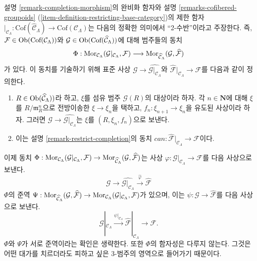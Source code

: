 \begin{remark}
\label{remark-completion-restriction-adjoint}
설명 \ref{remark-completion-morphism}의 완비화 함자와 설명
\ref{remarks-cofibered-groupoids}
(\ref{item-definition-restricting-base-category})의 제한 함자
$|_{\mathcal{C}_\Lambda} : \text{Cof}(\widehat{\mathcal{C}}_\Lambda)
\to \text{Cof}(\mathcal{C}_\Lambda)$는 다음의 정확한 의미에서
``2-수반''이라고 주장한다. 즉,
$\mathcal{F} \in \mathop{\mathrm{Ob}}\nolimits(\text{Cof}(\mathcal{C}_\Lambda))$와
$\mathcal{G} \in \mathop{\mathrm{Ob}}\nolimits(\text{Cof}(\widehat{\mathcal{C}}_\Lambda))$에 대해
범주들의 동치
$$
\Phi :
\mathop{\mathrm{Mor}}\nolimits_{\mathcal{C}_\Lambda}(
\mathcal{G}|_{\mathcal{C}_\Lambda}, \mathcal{F})
\longrightarrow
\mathop{\mathrm{Mor}}\nolimits_{\widehat{\mathcal{C}}_\Lambda}(\mathcal{G}, \widehat{\mathcal{F}})
$$
가 있다. 이 동치를 기술하기 위해 표준 사상
$\mathcal{G} \to \widehat{\mathcal{G}|_{\mathcal{C}_\Lambda}}$와
$\widehat{\mathcal{F}}|_{\mathcal{C}_\Lambda} \to \mathcal{F}$를
다음과 같이 정의한다.
\begin{enumerate}
\item $R \in \mathop{\mathrm{Ob}}\nolimits(\widehat{\mathcal{C}}_\Lambda))$라 하고,%
$\xi$를 섬유 범주 $\mathcal{G}(R)$의 대상이라 하자.
각 $n \in \mathbf{N}$에 대해 $\xi$를
$R/\mathfrak m_R^n$으로 전방이송한 $\xi \to \xi_n$을 택하고,
$f_n : \xi_{n + 1} \to \xi_n$을 유도된 사상이라 하자. 그러면
$\mathcal{G} \to \widehat{\mathcal{G}|_{\mathcal{C}_\Lambda}}$는
$\xi$를 $(R, \xi_n, f_n)$으로 보낸다.
\item 이는 설명 \ref{remark-restrict-completion}의 동치
$can : \widehat{\mathcal{F}}|_{\mathcal{C}_\Lambda} \to \mathcal{F}$이다.
\end{enumerate}
이제 동치
$\Phi : \mathop{\mathrm{Mor}}\nolimits_{\mathcal{C}_\Lambda}(
\mathcal{G}|_{\mathcal{C}_\Lambda}, \mathcal{F})  \to
\mathop{\mathrm{Mor}}\nolimits_{\widehat{\mathcal{C}}_\Lambda}(\mathcal{G},
\widehat{\mathcal{F}})$는 사상
$\varphi : \mathcal{G}|_{\mathcal{C}_\Lambda} \to \mathcal{F}$를
다음 사상으로 보낸다.
$$
\mathcal{G} \to \widehat{\mathcal{G}|_{\mathcal{C}_\Lambda}}
\xrightarrow{\widehat{\varphi}} \widehat{\mathcal{F}}
$$
$\Phi$의 준역
$\Psi :
\mathop{\mathrm{Mor}}\nolimits_{\widehat{\mathcal{C}}_\Lambda}(
\mathcal{G}, \widehat{\mathcal{F}}) \to
\mathop{\mathrm{Mor}}\nolimits_{\mathcal{C}_\Lambda}(
\mathcal{G}|_{\mathcal{C}_\Lambda}, \mathcal{F})$가 있으며, 이는
$\psi : \mathcal{G} \to \widehat{\mathcal{F}}$를 다음 사상으로 보낸다.
$$
\mathcal{G}|_{\mathcal{C}_\Lambda} \xrightarrow{\psi|_{\mathcal{C}_\Lambda}}
\widehat{\mathcal{F}}|_{\mathcal{C}_\Lambda} \to \mathcal{F}.
$$
$\Phi$와 $\Psi$가 서로 준역이라는 확인은 생략한다. 또한 $\Phi$의
함자성은 다루지 않는다. 그것은 어떤 대가를 치르더라도 피하고 싶은
3-범주의 영역으로 들어가기 때문이다.
\end{remark}

